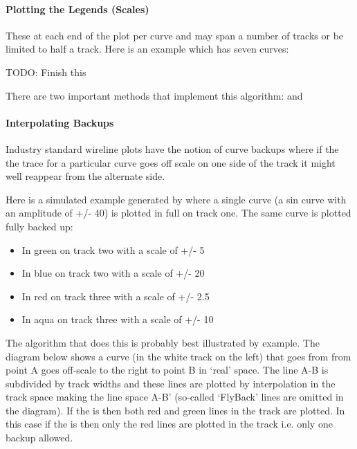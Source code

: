 \documentclass[letterpaper,10pt,english]{sphinxmanual}
\begin{document}
\paragraph{Plotting the Legends (Scales)}
\label{\detokenize{tech/plotting:tech-plotting-legends}}\label{\detokenize{tech/plotting:plotting-the-legends-scales}}
These at each end of the plot per curve and may span a number of tracks or be limited to half a track. Here is an example which has seven curves:

TODO: Finish this

\noindent{}

There are two important methods that implement this algorithm:  and 


\paragraph{Interpolating Backups}
\label{\detokenize{tech/plotting:interpolating-backups}}
Industry standard wireline plots have the notion of curve backups where if the the trace for a particular curve goes off scale on one side of the track it might well reappear from the alternate side.

Here is a simulated example generated by  where a single curve (a sin curve with an amplitude of +/- 40) is plotted in full on track one. The same curve is plotted fully backed up:
\begin{itemize}
\item {} 
In green on track two with a scale of +/- 5

\item {} 
In blue on track two with a scale of +/- 20

\item {} 
In red on track three with a scale of +/- 2.5

\item {} 
In aqua on track three with a scale of +/- 10

\end{itemize}

\noindent{}

The algorithm that does this is probably best illustrated by example. The diagram below shows a curve (in the white track on the left) that goes from from point A goes off-scale to the right to point B in ‘real’ space. The line A-B is subdivided by track widths and these  lines are plotted by interpolation in the track space making the line space A-B’ (so-called ‘FlyBack’ lines are omitted in the diagram). If the {\hyperref[\detokenize{glossary:term-backup-mode}]{}} is  then both red and green lines in the track are plotted. In this case if the {\hyperref[\detokenize{glossary:term-backup-mode}]{}} is  then only the red lines are plotted in the track i.e. only one backup allowed.
\end{document}
